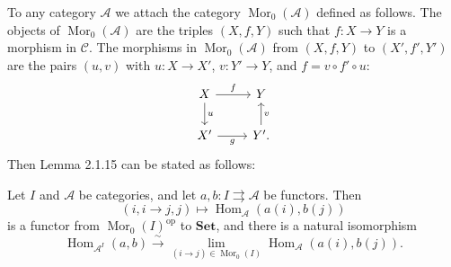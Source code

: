 \documentclass[12pt]{article}
\theoremstyle{remark}
\theoremstyle{definition}
\newcommand{\A}{\mathcal A}
\newcommand{\C}{\mathcal C}
\newcommand{\parar}{\rightrightarrows}\newcommand{\paralelarrows}{\rightrightarrows}%
\newcommand{\Set}{\mathbf{Set}}
\newcommand{\xr}{\xrightarrow}
\DeclareMathOperator{\Hom}{Hom}%
\DeclareMathOperator{\Mor}{Mor}
\DeclareMathOperator{\op}{op}
\begin{document}
To any category $\A$ we attach the category $\Mor_0(\A)$ defined as follows. The objects of $\Mor_0(\A)$ are the triples $(X,f,Y)$ such that $f:X\to Y$ is a morphism in $\C$. The morphisms in $\Mor_0(\A)$ from $(X,f,Y)$ to $(X',f',Y')$ are the pairs $(u,v)$ with $u:X\to X'$, $v:Y'\to Y$, and $f=v\circ f'\circ u$:
$$
\begin{tikzcd}
X\ar{d}{u}\ar{r}{f}&Y\\ 
X'\ar{r}[swap]{g}&Y'\ar{u}[swap]{v}.
\end{tikzcd}
$$ 
Then Lemma 2.1.15 can be stated as follows: 

Let $I$ and $\A$ be categories, and let $a,b:I\parar\A$ be functors. Then 
$$
(i,i\to j,j)\mapsto\Hom_\A(a(i),b(j))
$$ 
is a functor from $\Mor_0(I)^{\op}$ to $\Set$, and there is a natural isomorphism 
%
\begin{equation}\label{2115} 
\Hom_{\A^I}(a,b)\xr\sim\lim_{(i\to j)\in\Mor_0(I)}\Hom_\A(a(i),b(j)).
\end{equation}
%
\end{document}
